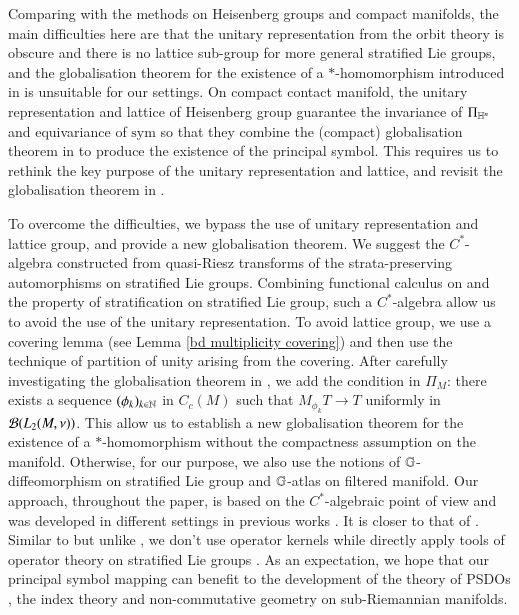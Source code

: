 \documentclass[leqno]{amsart}
\begin{document}
	Comparing with the methods on Heisenberg groups and compact manifolds, the main difficulties here are that the unitary representation from the orbit theory is obscure and there is no lattice sub-group for more general stratified Lie groups, and the globalisation theorem for the existence of a $*$-homomorphism introduced in \cite{DAO3} is unsuitable for our settings. On compact contact manifold, the unitary representation and lattice of Heisenberg group guarantee the invariance of $\Pi_{\mathbb{H}^{n}}$ and equivariance of $\mathrm{sym}$ so that they combine the (compact) globalisation theorem in \cite{DAO3} to  produce the existence of the principal symbol. %
	This requires us to rethink the key purpose of the unitary representation and lattice, and revisit the globalisation theorem in \cite{DAO3}.
	
	
	To overcome the difficulties, we bypass the use of unitary representation and lattice group, and provide a new globalisation theorem. We suggest the $C^{*}$-algebra constructed from  quasi-Riesz transforms of the strata-preserving automorphisms on stratified Lie groups. Combining functional calculus on \cite{MSZ-Cwikel} and the property of stratification on stratified Lie group, such a $C^{*}$-algebra allow us to avoid the use of the unitary representation. To avoid lattice group, we use  a covering lemma (see Lemma \ref{bd multiplicity covering}) and then use the technique of partition of unity arising from the covering. 
	After carefully investigating the globalisation theorem in \cite{DAO3}, 
	we add the condition in $\Pi_{M}$: there exists a sequence $(\phi_k)_{k\in\mathbb{N}}$ in $C_c(M)$ such that $M_{\phi_k}T\to T$ uniformly in ${\mathcal B}(L_{2}(M,\nu))$. This allow us to establish a new globalisation theorem for the existence of a $*$-homomorphism without the compactness assumption on the manifold.
	Otherwise, for our purpose, we also use the notions of $\mathbb{G}$-diffeomorphism on stratified Lie group and $\mathbb{G}$-atlas on filtered manifold. 
	Our approach, throughout the paper, is based on the $C^{\ast}$-algebraic point of view and was developed in different settings in previous works \cite{DAO1,DAO2,DAO3,DAO4}. It is closer to that of \cite{Taylor84,V2010b}. 
	Similar to \cite{DAO3,DAO4} but unlike \cite{V2010b}, we don't use operator kernels while directly apply tools of operator theory on stratified Lie groups \cite{MSZ-Cwikel}. 
	As an expectation, we hope that our principal symbol mapping can benefit to the development of the theory of PSDOs \cite{GV2022,JE-arxiv2023,RS1976,DGD2007,Po08,VY19,CY2022,GV2023}, the index theory \cite{AS1986-1,AS1986-3,MK2022,GV2022,MK2022,V2010,V2010b} and non-commutative geometry \cite{Connes1994,Po07,CY2023} on sub-Riemannian manifolds.
	
\end{document}
